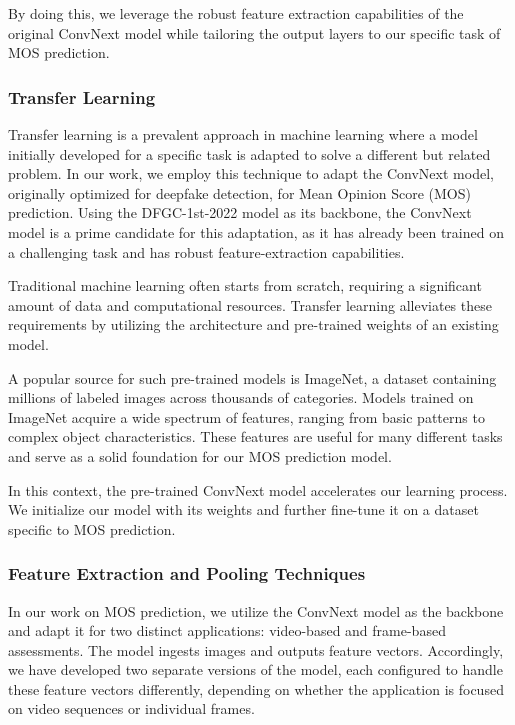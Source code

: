 \documentclass[a4paper,12pt,openright]{book}
\begin{document}
By doing this, we leverage the robust feature extraction capabilities of the original ConvNext model while tailoring the output layers to our specific task of MOS prediction.

\subsubsection{Transfer Learning}

Transfer learning is a prevalent approach in machine learning where a model initially developed for a specific task is adapted to solve a different but related problem. In our work, we employ this technique to adapt the ConvNext model, originally optimized for deepfake detection, for Mean Opinion Score (MOS) prediction. Using the DFGC-1st-2022 model as its backbone, the ConvNext model is a prime candidate for this adaptation, as it has already been trained on a challenging task and has robust feature-extraction capabilities.

Traditional machine learning often starts from scratch, requiring a significant amount of data and computational resources. Transfer learning alleviates these requirements by utilizing the architecture and pre-trained weights of an existing model.

A popular source for such pre-trained models is ImageNet, a dataset containing millions of labeled images across thousands of categories. Models trained on ImageNet acquire a wide spectrum of features, ranging from basic patterns to complex object characteristics. These features are useful for many different tasks and serve as a solid foundation for our MOS prediction model.

In this context, the pre-trained ConvNext model accelerates our learning process. We initialize our model with its weights and further fine-tune it on a dataset specific to MOS prediction. 

\subsubsection{Feature Extraction and Pooling Techniques}

In our work on MOS prediction, we utilize the ConvNext model as the backbone and adapt it for two distinct applications: video-based and frame-based assessments. The model ingests images and outputs feature vectors. Accordingly, we have developed two separate versions of the model, each configured to handle these feature vectors differently, depending on whether the application is focused on video sequences or individual frames.
\end{document}
